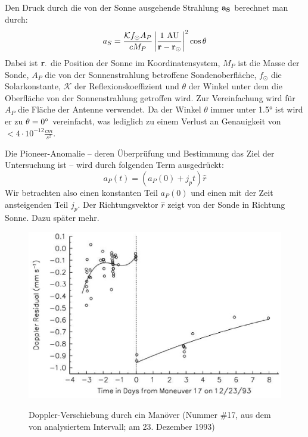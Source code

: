 Den Druck durch die von der Sonne ausgehende Strahlung $\bf a_S$ berechnet man durch:
\begin{equation}
a_S = \frac{\mathcal{K}f_\odot A_P}{c M_P} \left| \frac{1\ \mathrm{AU}}{{\bf r}-{\bf r_\odot}} \right|^2 \cos\theta
\end{equation}
Dabei ist $\bf r_\cdot$ die Position der Sonne im Koordinatensystem, $M_P$ ist die Masse der Sonde, $A_P$ die von der Sonnenstrahlung betroffene Sondenoberfläche, $f_\odot$ die Solarkonstante, $\mathcal{K}$ der Reflexionskoeffizient und $\theta$ der Winkel unter dem die Oberfläche von der Sonnenstrahlung getroffen wird.
Zur Vereinfachung wird für $A_P$ die Fläche der Antenne verwendet.
Da der Winkel $\theta$ immer unter 1.5° ist wird er zu $\theta = 0\degree$ vereinfacht, was lediglich zu einem Verlust an Genauigkeit von $< 4 \cdot 10^{-12} \frac{cm}{s^2}$.\cite{Markwardt2002}

Die Pioneer-Anomalie – deren Überprüfung und Bestimmung das Ziel der Untersuchung ist – wird durch folgenden Term ausgedrückt:
\begin{equation}
a_P(t) = \left( a_P(0) + j_pt\right)\hat{r}
\end{equation}
Wir betrachten also einen konstanten Teil $a_P(0)$ und einen mit der Zeit ansteigenden Teil $j_p$. Der Richtungsvektor $\hat{r}$ zeigt von der Sonde in Richtung Sonne. Dazu später mehr.

\begin{figure}[htbb]
\begin{minipage}[t]{.8\linewidth}
	\centering
	\includegraphics[width=\linewidth]{images/manoever}
	\label{fig:manoever}
  \caption{Doppler-Verschiebung durch ein Manöver (Nummer \#17, aus dem von \cite{Anderson2002} analysiertem Intervall; am 23. Dezember 1993)}
\end{minipage}
	\centering
 \end{figure}

